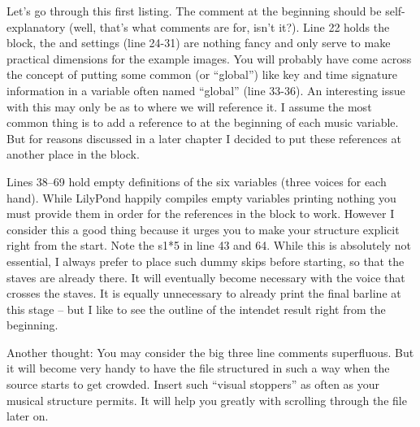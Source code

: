 \documentclass[../LilyPond-Tutorials]{subfiles}
\begin{document}

Let's go through this first listing. 
The comment at the beginning should be self-explanatory (well, that's what comments are for, isn't it?). 
Line 22 holds the  block, the  and  settings (line 24-31) are nothing fancy and only serve to make practical dimensions for the example images.
You will probably have come across the concept of putting some common (or “global”) like key and time signature information in a variable often named “global” (line 33-36). 
An interesting issue with this may only be as to where we will reference it. 
I assume the most common thing is to add a reference to  at the beginning of each music variable. 
But for reasons discussed in a later chapter I decided to put these references at another place in the  block.

Lines 38--69 hold empty definitions of the six variables (three voices for each hand). 
While LilyPond happily compiles empty variables printing nothing you must provide them in order for the references in the  block to work.
However I consider this a good thing because it urges you to make your structure explicit right from the start.
Note the s1*5 in line 43 and 64. 
While this is absolutely not essential, I always prefer to place such dummy skips before starting, so that the staves are already there. 
It will eventually become necessary with the voice that crosses the staves. 
It is equally unnecessary to already print the final barline at this stage – but I like to see the outline of the intendet result right from the beginning.

Another thought: You may consider the big three line comments superfluous. 
But it will become very handy to have the file structured in such a way when the source starts to get crowded. 
Insert such “visual stoppers” as often as your musical structure permits. 
It will help you greatly with scrolling through the file later on.
\end{document}
